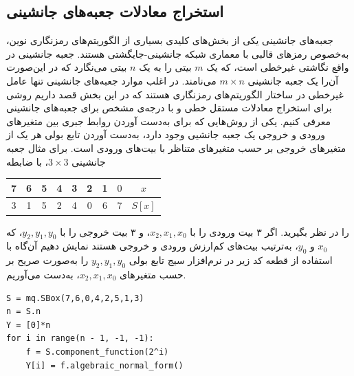 \subsection{استخراج معادلات جعبه‌های جانشینی}
جعبه‌های جانشینی یکی از بخش‌های کلیدی بسیاری از الگوریتم‌های رمزنگاری نوین، به‌خصوص رمزهای قالبی با معماری شبکه جانشینی-جایگشتی هستند.  جعبه‌ جانشینی در واقع نگاشتی غیرخطی است، که یک 
$m$
بیتی را به یک 
$n$
بیتی می‌نگارد که در این‌صورت آن‌را یک جعبه جانشینی 
$m\times n$
می‌نامند.  در اغلب موارد جعبه‌های جانشینی تنها عامل غیرخطی در ساختار الگوریتم‌های رمزنگاری هستند که  در این بخش قصد داریم روشی برای استخراج معادلات مستقل خطی و با درجه‌ی مشخص برای جعبه‌های جانشینی معرفی کنیم. یکی از روش‌هایی که برای به‌دست آوردن روابط جبری بین متغیرهای ورودی و خروجی یک جعبه جانشیی وجود دارد، به‌دست آوردن تابع بولی هر یک از متغیرهای خروجی بر حسب متغیرهای متناظر با بیت‌های ورودی است. برای مثال جعبه جانشینی 
$3\times 3$، 
با ضابطه 
\begin{center}
	
	\begin{tabular}{|c|c|c|c|c|c|c|c||c|}
		\hline 
		7 & 6 & 5 & 4 & 3 & 2 & 1 & $0$ & $x$ \\ 
		\hline 
		3 & 1 & 5 & 2 & 4 & $0$ & 6 & 7 & $S[x]$ \\ 
		\hline 
	\end{tabular}
	
\end{center}
را در نظر بگیرید. اگر ۳ بیت ورودی را با 
$x_{2},x_{1},x_{0}$، 
و ۳ بیت خروجی را با 
$y_{2},y_{1},y_{0}$، 
که 
$x_{0}$
و 
$y_{0}$، 
به‌ترتیب بیت‌های کم‌ارزش ورودی و خروجی هستند نمایش دهیم آن‌گاه با استفاده از قطعه کد زیر در نرم‌افزار سیج تابع بولی 
$y_{2},y_{1},y_{0}$
را به‌صورت صریح بر حسب متغیرهای 
$x_{2},x_{1},x_{0}$، 
به‌دست می‌آوریم. 
 \begin{latin}
\begin{flushleft}
\begin{lstlisting}
S = mq.SBox(7,6,0,4,2,5,1,3)
n = S.n
Y = [0]*n
for i in range(n - 1, -1, -1):
    f = S.component_function(2^i)
    Y[i] = f.algebraic_normal_form()
\end{lstlisting}
\end{flushleft}
\end{latin}
